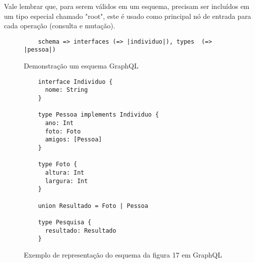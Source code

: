 Vale lembrar que, para serem válidos em um esquema, precisam ser incluídos em um tipo especial chamado "root", este é usado como principal nó de entrada para cada operação (consulta e mutação).

\begin{figure}[H]
  \centering
  \begin{verbatim}
    schema => interfaces (=> |individuo|), types  (=> |pessoa|)
  \end{verbatim}
  \caption{Demonstração um esquema GraphQL}
\end{figure}

\begin{figure}[H]
  \centering
  \begin{verbatim}
    interface Individuo {
      nome: String
    }

    type Pessoa implements Individuo {
      ano: Int
      foto: Foto
      amigos: [Pessoa]
    }

    type Foto {
      altura: Int
      largura: Int
    }

    union Resultado = Foto | Pessoa

    type Pesquisa {
      resultado: Resultado
    }
  \end{verbatim}
  \caption{Exemplo de representação do esquema da figura 17 em GraphQL}
\end{figure}
